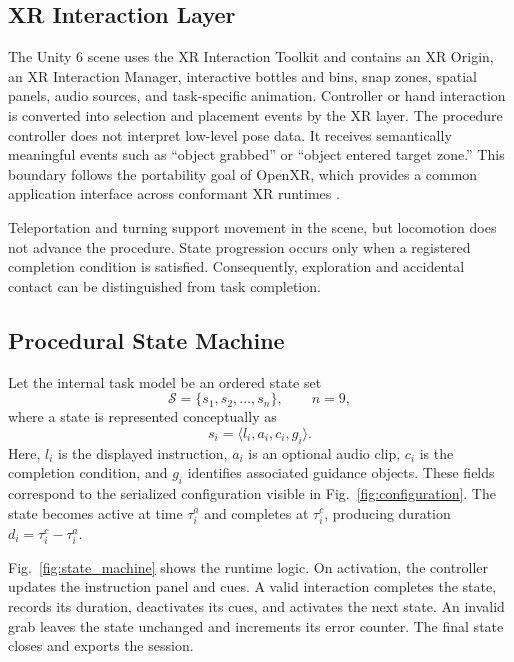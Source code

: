 \documentclass[conference]{IEEEtran}
\begin{document}
\subsection{XR Interaction Layer}

The Unity 6 scene uses the XR Interaction Toolkit and contains an XR Origin, an XR Interaction Manager, interactive bottles and bins, snap zones, spatial panels, audio sources, and task-specific animation. Controller or hand interaction is converted into selection and placement events by the XR layer. The procedure controller does not interpret low-level pose data. It receives semantically meaningful events such as ``object grabbed'' or ``object entered target zone.'' This boundary follows the portability goal of OpenXR, which provides a common application interface across conformant XR runtimes \cite{OpenXR}.

Teleportation and turning support movement in the scene, but locomotion does not advance the procedure. State progression occurs only when a registered completion condition is satisfied. Consequently, exploration and accidental contact can be distinguished from task completion.

\subsection{Procedural State Machine}

Let the internal task model be an ordered state set
\begin{equation}
\mathcal{S}=\{s_1,s_2,\ldots,s_n\}, \qquad n=9,
\end{equation}
where a state is represented conceptually as
\begin{equation}
s_i=\langle l_i,a_i,c_i,g_i\rangle.
\end{equation}
Here, $l_i$ is the displayed instruction, $a_i$ is an optional audio clip, $c_i$ is the completion condition, and $g_i$ identifies associated guidance objects. These fields correspond to the serialized configuration visible in Fig.~\ref{fig:configuration}. The state becomes active at time $\tau_i^{a}$ and completes at $\tau_i^{c}$, producing duration $d_i=\tau_i^{c}-\tau_i^{a}$.

Fig.~\ref{fig:state_machine} shows the runtime logic. On activation, the controller updates the instruction panel and cues. A valid interaction completes the state, records its duration, deactivates its cues, and activates the next state. An invalid grab leaves the state unchanged and increments its error counter. The final state closes and exports the session.
\end{document}
